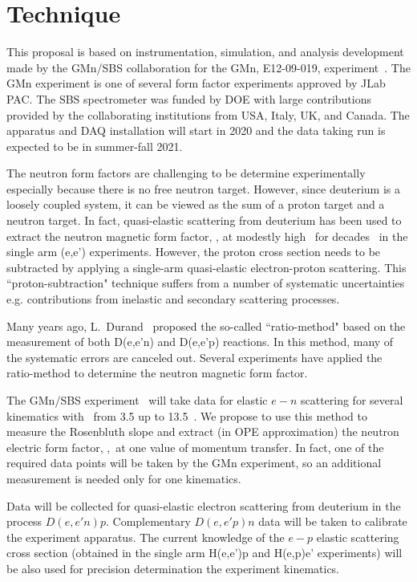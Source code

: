 \section{Technique}\label{sec:exp_method}
%
This proposal is based on instrumentation, simulation, and analysis development made by the GMn/SBS collaboration for the GMn, E12-09-019, experiment~\cite{E12-09-019}.
The GMn experiment is one of several form factor experiments approved by JLab PAC. 
The SBS spectrometer was funded by DOE with large contributions provided by the collaborating institutions from USA, Italy, UK, and Canada. 
The apparatus and DAQ installation will start in 2020 and the data taking run is expected to be in summer-fall 2021.

The neutron form factors are challenging to be determine experimentally especially because there is no free neutron target. 
However, since deuterium is a loosely coupled system, it can be viewed as the sum of a proton target and a neutron target. 
In fact, quasi-elastic scattering from deuterium has been used to extract the neutron magnetic form factor, \gmn, at modestly high \qsq~for decades~\cite{Hughes:1965zza, Arnold:1988us} in the single arm (e,e') experiments. 
However, the proton cross section needs to be subtracted by applying a single-arm quasi-elastic electron-proton scattering. 
This ``proton-subtraction" technique suffers from a number of systematic uncertainties e.g. contributions from inelastic and secondary scattering processes. 

Many years ago, L.~Durand~\cite{Durand:1959zz} proposed the so-called ``ratio-method" based on the measurement of both D(e,e'n) and D(e,e'p) reactions. 
In this method, many of the systematic errors are canceled out. 
Several experiments \cite{Bruins:1995ns, Kubon:2001rj, Lachniet:2008qf} have applied the ratio-method to determine the neutron magnetic form factor.

The GMn/SBS experiment~\cite{E12-09-019} will take data for elastic $e-n$ scattering for several kinematics with \qsq~from 3.5 up to 13.5~\gevcsq.
We propose to use this method to measure the Rosenbluth slope and extract (in OPE approximation) the neutron electric form factor, \gen,~at one value of momentum transfer.
In fact, one of the required data points will be taken by the GMn experiment, so an additional measurement is needed only for one
kinematics.

Data will be collected for quasi-elastic electron scattering from deuterium in the process $D(e,e'n)p$. 
Complementary $D(e,e'p)n$ data will be taken to calibrate the experiment apparatus.
The current knowledge of the $e-p$ elastic scattering cross section (obtained in the single arm H(e,e')p and H(e,p)e' experiments) will be also used
for precision determination the experiment kinematics.

